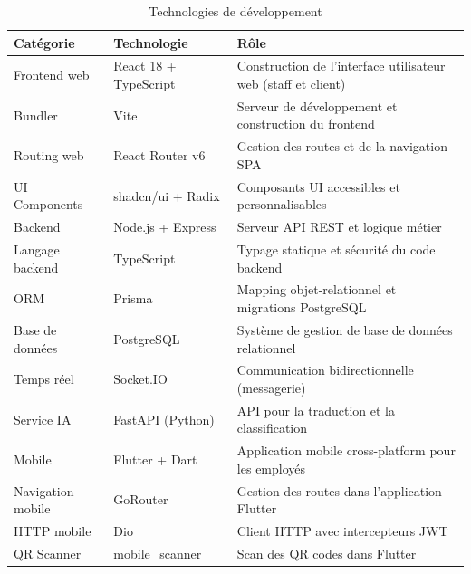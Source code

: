 \begin{table}[H]
\centering
\caption{Technologies de développement}
\small
\begin{tabularx}{\textwidth}{|p{2.5cm}|p{3cm}|X|}
\hline
\textbf{Catégorie} & \textbf{Technologie} & \textbf{Rôle} \\ \hline
Frontend web & React 18 + TypeScript & Construction de l'interface utilisateur web (staff et client) \\ \hline
Bundler & Vite & Serveur de développement et construction du frontend \\ \hline
Routing web & React Router v6 & Gestion des routes et de la navigation SPA \\ \hline
UI Components & shadcn/ui + Radix & Composants UI accessibles et personnalisables \\ \hline
Backend & Node.js + Express & Serveur API REST et logique métier \\ \hline
Langage backend & TypeScript & Typage statique et sécurité du code backend \\ \hline
ORM & Prisma & Mapping objet-relationnel et migrations PostgreSQL \\ \hline
Base de données & PostgreSQL & Système de gestion de base de données relationnel \\ \hline
Temps réel & Socket.IO & Communication bidirectionnelle (messagerie) \\ \hline
Service IA & FastAPI (Python) & API pour la traduction et la classification \\ \hline
Mobile & Flutter + Dart & Application mobile cross-platform pour les employés \\ \hline
Navigation mobile & GoRouter & Gestion des routes dans l'application Flutter \\ \hline
HTTP mobile & Dio & Client HTTP avec intercepteurs JWT \\ \hline
QR Scanner & mobile\_scanner & Scan des QR codes dans Flutter \\ \hline
\end{tabularx}
\label{tab:technologies_developpement}
\end{table}
\FloatBarrier
